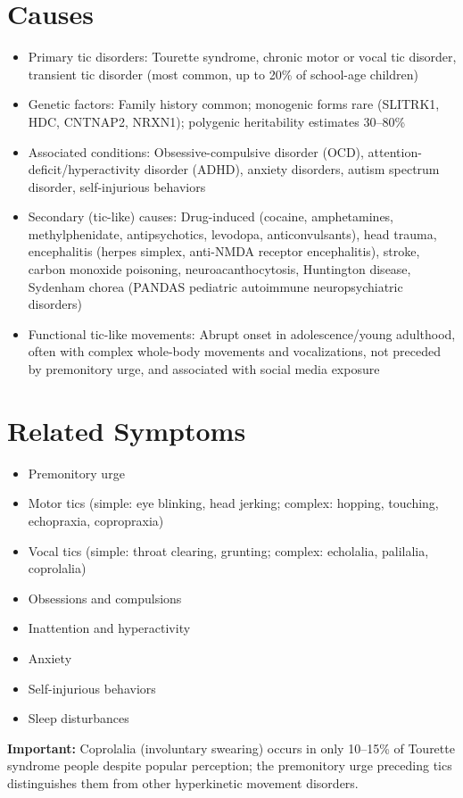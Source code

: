 \section*{Causes}
\begin{itemize}
  \item Primary tic disorders: Tourette syndrome, chronic motor or vocal tic disorder, transient tic disorder (most common, up to 20\% of school-age children)
  \item Genetic factors: Family history common; monogenic forms rare (SLITRK1, HDC, CNTNAP2, NRXN1); polygenic heritability estimates 30--80\%
  \item Associated conditions: Obsessive-compulsive disorder (OCD), attention-deficit/hyperactivity disorder (ADHD), anxiety disorders, autism spectrum disorder, self-injurious behaviors
  \item Secondary (tic-like) causes: Drug-induced (cocaine, amphetamines, methylphenidate, antipsychotics, levodopa, anticonvulsants), head trauma, encephalitis (herpes simplex, anti-NMDA receptor encephalitis), stroke, carbon monoxide poisoning, neuroacanthocytosis, Huntington disease, Sydenham chorea (PANDAS pediatric autoimmune neuropsychiatric disorders)
  \item Functional tic-like movements: Abrupt onset in adolescence/young adulthood, often with complex whole-body movements and vocalizations, not preceded by premonitory urge, and associated with social media exposure
\end{itemize}

\section*{Related Symptoms}
\begin{itemize}
  \item Premonitory urge
  \item Motor tics (simple: eye blinking, head jerking; complex: hopping, touching, echopraxia, copropraxia)
  \item Vocal tics (simple: throat clearing, grunting; complex: echolalia, palilalia, coprolalia)
  \item Obsessions and compulsions
  \item Inattention and hyperactivity
  \item Anxiety
  \item Self-injurious behaviors
  \item Sleep disturbances
\end{itemize}
\textbf{Important:} Coprolalia (involuntary swearing) occurs in only 10--15\% of Tourette syndrome people despite popular perception; the premonitory urge preceding tics distinguishes them from other hyperkinetic movement disorders.


